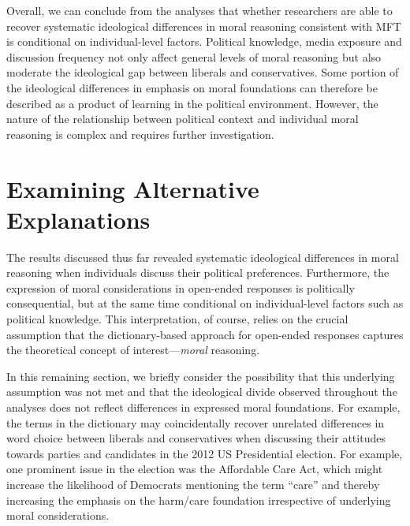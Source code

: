 \documentclass[12pt]{article}
\begin{document}
Overall, we can conclude from the analyses that whether researchers are able to recover systematic ideological differences in moral reasoning consistent with MFT is conditional on individual-level factors. Political knowledge, media exposure and discussion frequency not only affect general levels of moral reasoning but also moderate the ideological gap between liberals and conservatives. Some portion of the ideological differences in emphasis on moral foundations can therefore be described as a product of learning in the political environment. However, the nature of the relationship between political context and individual moral reasoning is complex and requires further investigation.


\section*{Examining Alternative Explanations}

The results discussed thus far revealed systematic ideological differences in moral reasoning when individuals discuss their political preferences. Furthermore, the expression of moral considerations in open-ended responses is politically consequential, but at the same time conditional on individual-level factors such as political knowledge. This interpretation, of course, relies on the crucial assumption that the dictionary-based approach for open-ended responses captures the theoretical concept of interest---\textit{moral} reasoning.

In this remaining section, we briefly consider the possibility that this underlying assumption was not met and that the ideological divide observed throughout the analyses does not reflect differences in expressed moral foundations. For example, the terms in the dictionary may coincidentally recover unrelated differences in word choice between liberals and conservatives when discussing their attitudes towards parties and candidates in the 2012 US Presidential election. For example, one prominent issue in the election was the Affordable Care Act, which might increase the likelihood of Democrats mentioning the term ``care'' and thereby increasing the emphasis on the harm/care foundation irrespective of underlying moral considerations.
\end{document}
